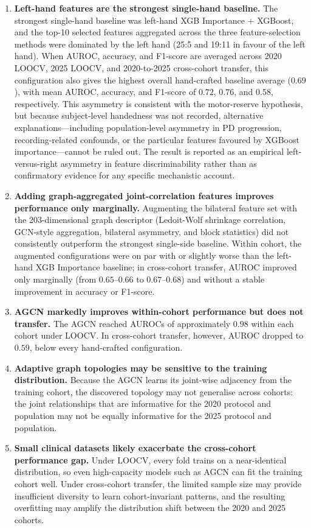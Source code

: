 \begin{enumerate}
    \item \textbf{Left-hand features are the strongest single-hand baseline.} The strongest single-hand baseline was left-hand XGB Importance + XGBoost, and the top-10 selected features aggregated across the three feature-selection methods were dominated by the left hand (25:5 and 19:11 in favour of the left hand). When AUROC, accuracy, and F1-score are averaged across 2020 LOOCV, 2025 LOOCV, and 2020-to-2025 cross-cohort transfer, this configuration also gives the highest overall hand-crafted baseline average ($0.69$), with mean AUROC, accuracy, and F1-score of $0.72$, $0.76$, and $0.58$, respectively. This asymmetry is consistent with the motor-reserve hypothesis, but because subject-level handedness was not recorded, alternative explanations---including population-level asymmetry in PD progression, recording-related confounds, or the particular features favoured by XGBoost importance---cannot be ruled out. The result is reported as an empirical left-versus-right asymmetry in feature discriminability rather than as confirmatory evidence for any specific mechanistic account.

    \item \textbf{Adding graph-aggregated joint-correlation features improves performance only marginally.} Augmenting the bilateral feature set with the 203-dimensional graph descriptor (Ledoit-Wolf shrinkage correlation, GCN-style aggregation, bilateral asymmetry, and block statistics) did not consistently outperform the strongest single-side baseline. Within cohort, the augmented configurations were on par with or slightly worse than the left-hand XGB Importance baseline; in cross-cohort transfer, AUROC improved only marginally (from $0.65$--$0.66$ to $0.67$--$0.68$) and without a stable improvement in accuracy or F1-score.

    \item \textbf{AGCN markedly improves within-cohort performance but does not transfer.} The AGCN reached AUROCs of approximately $0.98$ within each cohort under LOOCV. In cross-cohort transfer, however, AUROC dropped to $0.59$, below every hand-crafted configuration.

    \item \textbf{Adaptive graph topologies may be sensitive to the training distribution.} Because the AGCN learns its joint-wise adjacency from the training cohort, the discovered topology may not generalise across cohorts: the joint relationships that are informative for the 2020 protocol and population may not be equally informative for the 2025 protocol and population.

    \item \textbf{Small clinical datasets likely exacerbate the cross-cohort performance gap.} Under LOOCV, every fold trains on a near-identical distribution, so even high-capacity models such as AGCN can fit the training cohort well. Under cross-cohort transfer, the limited sample size may provide insufficient diversity to learn cohort-invariant patterns, and the resulting overfitting may amplify the distribution shift between the 2020 and 2025 cohorts.
\end{enumerate}

